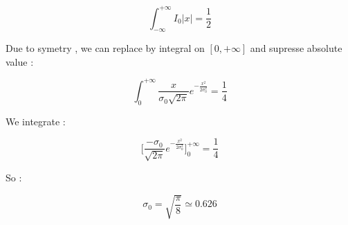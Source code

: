 \begin{equation}
    \int_{-\infty}^{+\infty} I_0 |x| = \frac{1}{2}
\end{equation}

Due to symetry , we can replace by integral on $[0,+\infty]$ and supresse absolute value :

\begin{equation}
    \int_{0}^{+\infty} \frac{x}{\sigma_0 \sqrt{2\pi}} e^{-\frac{x^2}{2\sigma_0^2}}  = \frac{1}{4}
\end{equation}

We integrate :

\begin{equation}
      \lbrack  \frac{-\sigma_0}{\sqrt{2\pi}} e^{-\frac{x^2}{2\sigma_0^2}}\rbrack  _{0}^{+\infty}  = \frac{1}{4}
\end{equation}

So :

\begin{equation}
      \sigma_0 = \sqrt{\frac{\pi}{8}} \simeq 0.626
\end{equation}


